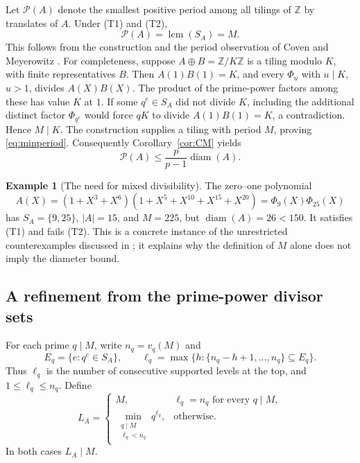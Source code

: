 \documentclass[11pt]{article}
\theoremstyle{definition}
\newtheorem{example}[theorem]{Example}
\theoremstyle{remark}
\numberwithin{equation}{section}
\DeclareMathOperator{\diam}{diam}
\DeclareMathOperator{\lcm}{lcm}
\newcommand{\Z}{\mathbb Z}
\begin{document}
Let $\mathcal P(A)$ denote the smallest positive period among all
tilings of $\Z$ by translates of $A$. Under (T1) and (T2),
\begin{equation}\label{eq:minperiod}
 \mathcal P(A)=\lcm(S_A)=M.
\end{equation}
This follows from the construction and the period observation of
Coven and Meyerowitz \cite[Theorem~A and remarks after Lemma~2.1]{CM}.
For completeness, suppose $A\oplus B=\Z/K\Z$ is a tiling modulo $K$,
with finite representatives $B$. Then $A(1)B(1)=K$, and every
$\Phi_u$ with $u\mid K$, $u>1$, divides $A(X)B(X)$.
The product of the prime-power factors among these has value $K$ at
$1$. If some $q^e\in S_A$ did not divide $K$, including the additional
distinct factor $\Phi_{q^e}$ would force $qK$ to divide $A(1)B(1)=K$,
a contradiction. Hence $M\mid K$. The construction supplies a tiling
with period $M$, proving \eqref{eq:minperiod}.
Consequently Corollary~\ref{cor:CM} yields
\[
 \mathcal P(A)\le\frac{p}{p-1}\diam(A).
\]

\begin{example}[The need for mixed divisibility]\label{ex:no-T2}
The zero--one polynomial
\[
 A(X)=(1+X^3+X^6)(1+X^5+X^{10}+X^{15}+X^{20})
      =\Phi_9(X)\Phi_{25}(X)
\]
has $S_A=\{9,25\}$, $|A|=15$, and $M=225$, but $\diam(A)=26<150$.
It satisfies (T1) and fails (T2). This is a concrete instance of the
unrestricted counterexamples discussed in \cite[Section~4]{LZ}; it
explains why the definition of $M$ alone does not imply the diameter
bound.
\end{example}

\subsection{A refinement from the prime-power divisor sets}

For each prime $q\mid M$, write $n_q=v_q(M)$ and
\[
 E_q=\{e:q^e\in S_A\},\qquad
 \ell_q=\max\{h:\{n_q-h+1,\ldots,n_q\}\subseteq E_q\}.
\]
Thus $\ell_q$ is the number of consecutive supported levels at the top,
and $1\le\ell_q\le n_q$. Define
\begin{equation}\label{eq:L}
 L_A=
 \begin{cases}
 M,&\ell_q=n_q\text{ for every }q\mid M,\\
 \displaystyle\min_{\substack{q\mid M\\\ell_q<n_q}}q^{\ell_q},
 &\text{otherwise}.
 \end{cases}
\end{equation}
In both cases $L_A\mid M$.
\end{document}
